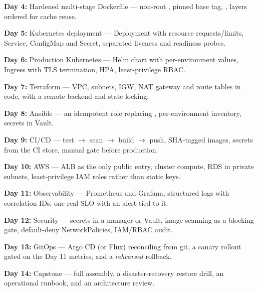 \begin{checklist}
  \item \textbf{Day 4:} Hardened multi-stage Dockerfile --- non-root , pinned base tag, , layers ordered for cache reuse.
  \item \textbf{Day 5:} Kubernetes deployment --- Deployment with resource requests/limits, Service, ConfigMap and Secret, separated liveness and readiness probes.
  \item \textbf{Day 6:} Production Kubernetes --- Helm chart with per-environment values, Ingress with TLS termination, HPA, least-privilege RBAC.
\end{checklist}

\begin{checklist}
  \item \textbf{Day 7:} Terraform --- VPC, subnets, IGW, NAT gateway and route tables in code, with a remote backend and state locking.
  \item \textbf{Day 8:} Ansible --- an idempotent role replacing , per-environment inventory, secrets in Vault.
  \item \textbf{Day 9:} CI/CD --- test $\rightarrow$ scan $\rightarrow$ build $\rightarrow$ push, SHA-tagged images, secrets from the CI store, manual gate before production.
  \item \textbf{Day 10:} AWS --- ALB as the only public entry, cluster compute, RDS in private subnets, least-privilege IAM roles rather than static keys.
\end{checklist}

\begin{checklist}
  \item \textbf{Day 11:} Observability --- Prometheus and Grafana, structured logs with correlation IDs, one real SLO with an alert tied to it.
  \item \textbf{Day 12:} Security --- secrets in a manager or Vault, image scanning as a blocking gate, default-deny NetworkPolicies, IAM/RBAC audit.
  \item \textbf{Day 13:} GitOps --- Argo CD (or Flux) reconciling from git, a canary rollout gated on the Day 11 metrics, and a \emph{rehearsed} rollback.
  \item \textbf{Day 14:} Capstone --- full assembly, a disaster-recovery restore drill, an operational runbook, and an architecture review.
\end{checklist}


